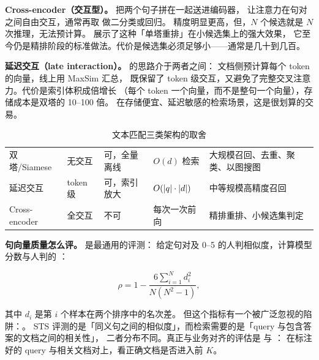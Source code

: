 \textbf{Cross-encoder（交互型）。} 把两个句子拼在一起送进编码器，
让注意力在句对之间自由交互，通常再取 \code{[CLS]} 做二分类或回归。
精度明显更高，但，$N$ 个候选就是 $N$ 次推理，无法预计算。
\cite{nogueira2019monobert} 展示了这种「单塔重排」在小候选集上的强大效果，
它至今仍是精排阶段的标准做法。代价是候选集必须足够小——通常是几十到几百。

\textbf{延迟交互（late interaction）。} \cite{khattab2020colbert} 的思路介于两者之间：
文档侧预计算每个 token 的向量，线上用 MaxSim 汇总，
既保留了 token 级交互，又避免了完整交叉注意力。代价是索引体积成倍增长
（每个 token 一个向量，而不是整句一个向量），存储成本是双塔的 10--100 倍。
在存储便宜、延迟敏感的检索场景，这是很划算的交易。

\begin{table}[htbp]
\centering
\caption{文本匹配三类架构的取舍}
\label{tab:matching-arch}
\small
\begin{tabularx}{\textwidth}{L{2.0cm} L{2.0cm} L{1.8cm} L{1.8cm} Y}
\toprule
{} &  &  &  &  \\
\midrule
双塔/Siamese & 无交互 & 可，全量离线 & $O(d)$ 检索 & 大规模召回、去重、聚类、以图搜图 \\
\addlinespace
延迟交互 & token 级 & 可，索引放大 & $O(\left\lvert q \right\rvert\cdot\left\lvert d \right\rvert)$ & 中等规模高精度召回 \\
\addlinespace
Cross-encoder & 全交互 & 不可 & 每次一次前向 & 精排重排、小候选集判定 \\
\bottomrule
\end{tabularx}
\end{table}

\textbf{句向量质量怎么评。}  是最通用的评测：
给定句对及 0--5 的人判相似度，计算模型分数与人判的 ：

\begin{equation}
\rho = 1 - \frac{6 \sum_{i=1}^{N} d_i^2}{N(N^2 - 1)},
\label{eq:spearman}
\end{equation}

其中 $d_i$ 是第 $i$ 个样本在两个排序中的名次差。
但这个指标有一个被广泛忽视的陷阱：。
STS 评测的是「同义句之间的相似度」，而检索需要的是「query 与包含答案的文档之间的相关性」，
二者分布不同。真正与业务对齐的评估是  与 ：
在标注好的 query 与相关文档对上，看正确文档是否进入前 $K$。

